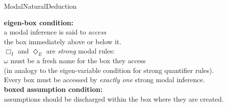\calculusAcronym{\NDK}




\maketitle

\begin{entry}{ModalNaturalDeduction}  

\newcommand{\s}{\qquad}
\newcommand{\nec}{\Box} %
\newcommand{\pos}{\Diamond} %

\begin{calculus}

\s\s\s\s\s\s
\infer[\nec_I]{\nec A}{\omega: \fbox{\infer*{A}{}} }
\s\s\s\s
\infer[\nec_E]{w: \fbox{ \infer*{}{A} } }{\nec A}

\vspace{2em}

\s\s\s\s\s\s
\infer[\pos_I]{\pos A}{w: \fbox{\infer*{A}{}} }
\s\s\s\s
\infer[\pos_E]{\omega: \fbox{ \infer*{}{A} } }{\pos A}

\vspace{1em}


\begin{center}
  \textbf{eigen-box condition:}\\ 
  a modal inference is said to \emph{access}\\
   the box immediately above or below it. \\
  $\nec_I$ and $\pos_E$ are \emph{strong} modal rules: \\
  $\omega$ must be a fresh name for the box they access \\ 
  (in analogy to the eigen-variable condition for strong quantifier rules). \\
  Every box must be accessed by \emph{exactly one} strong modal inference. \\
  \vspace{0.5em}
  \textbf{boxed assumption condition:} \\
  assumptions should be discharged within the box where they are created.
\end{center}


\end{calculus}
\end{entry}
